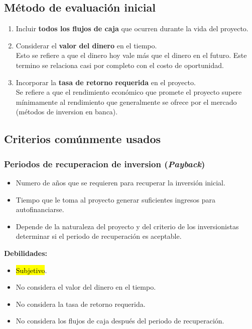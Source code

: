 \documentclass{templateNote}
\begin{document}
\subsection*{Método de evaluación inicial}
\begin{enumerate}[label=\alph*)]
    \item Incluir \textbf{todos los flujos de caja} que ocurren durante la vida del proyecto.
    \begin{center}
    \end{center}
    \item Considerar el \textbf{valor del dinero} en el tiempo. \\
    Esto se refiere a que el dinero hoy vale más que el dinero en el futuro. Este termino se relaciona casi por completo con el costo de oportunidad.
    \item Incorporar la \textbf{tasa de retorno requerida} en el proyecto.\\
    Se refiere a que el rendimiento económico que promete el proyecto supere mínimamente al rendimiento que generalmente se ofrece por el mercado (métodos de inversion en banca).
\end{enumerate}

\subsection*{Criterios comúnmente usados}

\subsubsection*{Periodos de recuperacion de inversion (\textit{Payback})}
\begin{itemize}
    \item Numero de años que se requieren para recuperar la inversión inicial.
    \item Tiempo que le toma al proyecto generar suficientes ingresos para autofinanciarse.
    \item Depende de la naturaleza del proyecto y del criterio de los inversionistas determinar si el periodo de recuperación es aceptable. 
\end{itemize}
\textbf{Debilidades:}
\begin{itemize}
    \item \hl{Subjetivo}.
    \item No considera el valor del dinero en el tiempo.
    \item No considera la tasa de retorno requerida.
    \item No considera los flujos de caja después del periodo de recuperación.
\end{itemize}
\end{document}

